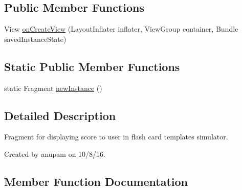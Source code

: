 \subsection*{Public Member Functions}
\begin{DoxyCompactItemize}
\item 
View \hyperlink{classorg_1_1buildmlearn_1_1toolkit_1_1flashcardtemplate_1_1fragment_1_1LastFragment_a8eda77bf8dc461ef95243b979841bdc8}{on\+Create\+View} (Layout\+Inflater inflater, View\+Group container, Bundle saved\+Instance\+State)
\end{DoxyCompactItemize}
\subsection*{Static Public Member Functions}
\begin{DoxyCompactItemize}
\item 
static Fragment \hyperlink{classorg_1_1buildmlearn_1_1toolkit_1_1flashcardtemplate_1_1fragment_1_1LastFragment_ae7bef4853055cbb5ee76436924abd4b3}{new\+Instance} ()
\end{DoxyCompactItemize}


\subsection{Detailed Description}
Fragment for displaying score to user in flash card template\textquotesingle{}s simulator. 

Created by anupam on 10/8/16. 

\subsection{Member Function Documentation}
